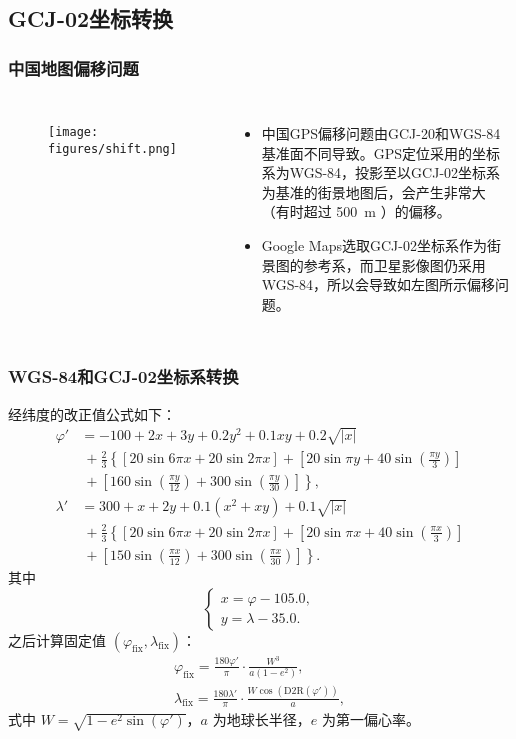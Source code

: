 \documentclass[10pt,xcolor=dvipsnames,fontset=none,punct=CCT]{ctexbeamer}
\begin{document}
\subsection{GCJ-02坐标转换}
\begin{frame}
  \frametitle{中国地图偏移问题}
  \begin{columns}[c]
    \begin{figure}[ht]
      \centering
      \texttt{[image: figures/shift.png]}
    \end{figure}

    \setlength{\parskip}{7pt plus 3pt minus 2pt}
    \begin{itemize}
    \item 中国GPS偏移问题由GCJ-20和WGS-84基准面不同导致。GPS定位采用的坐标系为WGS-84，投影至以GCJ-02坐标系为基准的街景地图后，会产生非常大（有时超过 \qty{500}{m} ）的偏移。
    \item Google Maps选取GCJ-02坐标系作为街景图的参考系，而卫星影像图仍采用WGS-84，所以会导致如左图所示偏移问题。
    \end{itemize}
  \end{columns}
\end{frame}

\begin{frame}[allowframebreaks]
  \frametitle{WGS-84和GCJ-02坐标系转换}
  经纬度的改正值公式如下\cite{wandergis}：
  \begin{align*}
    \varphi' &=-100+2x+3y+0.2y^2+0.1xy+0.2\sqrt{|x|}\\
    &\ {}+\frac23\left\{[20\sin 6\pi x+20\sin 2\pi x]+\left[20\sin \pi y+40\sin\left(\frac{\pi y}{3}\right)\right]\right.\\
    &\left.\ {}+\left[160\sin\left(\frac{\pi y}{12}\right)+300\sin\left(\frac{\pi y}{30}\right)\right]\right\},\\
    \lambda' &=300+x+2y+0.1(x^2+xy)+0.1\sqrt{|x|}\\
    &\ {}+\frac23\left\{[20\sin 6\pi x+20\sin 2\pi x]+\left[20\sin \pi x+40\sin\left(\frac{\pi x}{3}\right)\right]\right.\\
    &\left.\ {}+\left[150\sin\left(\frac{\pi x}{12}\right)+300\sin\left(\frac{\pi x}{30}\right)\right]\right\}.
  \end{align*}
  其中
  \begin{equation*}
  \begin{cases}
      x=\varphi-105.0,\\
      y=\lambda- 35.0.
  \end{cases}
  \end{equation*}
  之后计算固定值 $(\varphi_\mathrm{fix},\lambda_\mathrm{fix})$：
  \begin{gather*}
  \varphi_\mathrm{fix}=\frac{180\varphi'}{\pi}\cdot\frac{W^3}{a(1-e^2)},\\
  \lambda_\mathrm{fix}=\frac{180\lambda'}{\pi}\cdot\frac{W\cos\left(\mathrm{D2R}(\varphi')\right)}{a},
  \end{gather*}
  式中 $W=\sqrt{1-e^2\sin(\varphi')}$，$a$ 为地球长半径，$e$ 为第一偏心率。
\end{frame}
\end{document}
